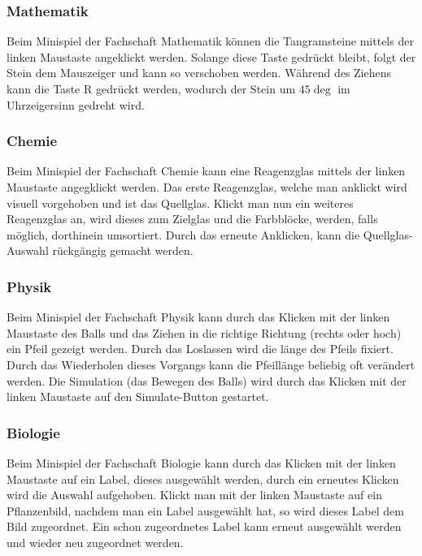 \subsubsection{Mathematik}

Beim Minispiel der Fachschaft Mathematik können die Tangramsteine mittels der linken Maustaste angeklickt werden.
Solange diese Taste gedrückt bleibt, folgt der Stein dem Mauszeiger und kann so verschoben werden.
Während des Ziehens kann die Taste \glqq R \grqq{} gedrückt werden, wodurch der Stein um $45\deg$ im Uhrzeigersinn gedreht wird.

\subsubsection{Chemie}

Beim Minispiel der Fachschaft Chemie kann eine Reagenzglas mittels der linken Maustaste angegklickt werden. Das erste Reagenzglas, welche man anklickt wird visuell vorgehoben und ist das Quellglas.
Klickt man nun ein weiteres Reagenzglas an, wird dieses zum Zielglas und die Farbblöcke, werden, falls möglich, dorthinein umsortiert.
Durch das erneute Anklicken, kann die Quellglas-Auswahl rückgängig gemacht werden.

\subsubsection{Physik}

Beim Minispiel der Fachschaft Physik kann durch das Klicken mit der linken Maustaste des Balls und das Ziehen in die richtige Richtung (rechts oder hoch) ein Pfeil gezeigt werden.
Durch das Loslassen wird die länge des Pfeils fixiert. Durch das Wiederholen dieses Vorgangs kann die Pfeillänge beliebig oft verändert werden.
Die Simulation (das Bewegen des Balls) wird durch das Klicken mit der linken Maustaste auf den Simulate-Button gestartet.

\subsubsection{Biologie}
Beim Minispiel der Fachschaft Biologie kann durch das Klicken mit der linken Maustaste auf ein Label, dieses ausgewählt werden, durch ein erneutes Klicken wird die Auswahl aufgehoben.
Klickt man mit der linken Maustaste auf ein Pflanzenbild, nachdem man ein Label ausgewählt hat, so wird dieses Label dem Bild zugeordnet. Ein schon zugeordnetes Label kann erneut ausgewählt werden und wieder neu zugeordnet werden.

